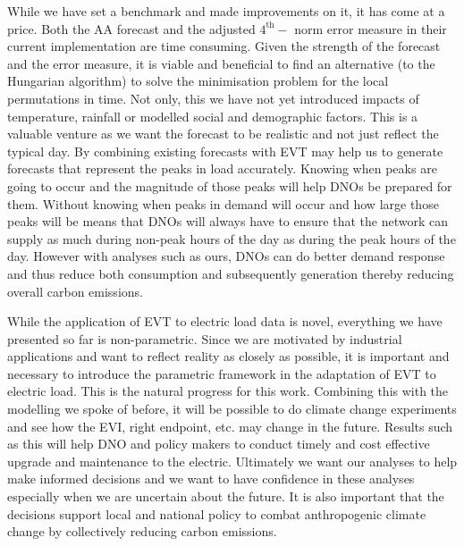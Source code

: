 While we have set a benchmark and made improvements on it, it has come at a price. Both the AA forecast and the adjusted $4^{\text{th}}-$ norm error measure in their current implementation are time consuming. Given the strength of the forecast and the error measure, it is viable and beneficial to find an alternative (to the Hungarian algorithm) to solve the minimisation problem for the local permutations in time. Not only, this we have not yet introduced impacts of temperature, rainfall or modelled social and demographic factors. This is a valuable venture as we want the forecast to be realistic and not just reflect the typical day. By combining existing forecasts with EVT may help us to generate forecasts that represent the peaks in load accurately. Knowing when peaks are going to occur and the magnitude of those peaks will help DNOs be prepared for them. Without knowing when peaks in demand will occur and how large those peaks will be means that DNOs will always have to ensure that the network can supply as much during non-peak hours of the day as during the peak hours of the day. However with analyses such as ours, DNOs can do better demand response and thus reduce both consumption and subsequently generation thereby reducing overall carbon emissions. %

While the application of EVT to electric load data is novel, everything we have presented so far is non-parametric. Since we are motivated by industrial applications and want to reflect reality as closely as possible, it is important and necessary to introduce the parametric framework in the adaptation of EVT to electric load. This is the natural progress for this work. Combining this with the modelling we spoke of before, it will be possible to do climate change experiments and see how the EVI, right endpoint, etc. may change in the future. Results such as this will help DNO and policy makers to conduct timely and cost effective upgrade and maintenance to the electric. Ultimately we want our analyses to help make informed decisions and we want to have confidence in these analyses especially when we are uncertain about the future. It is also important that the decisions support local and national policy to combat anthropogenic climate change by collectively reducing carbon emissions.